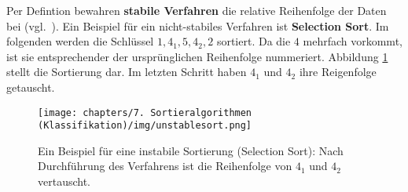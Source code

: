 Per Defintion bewahren \textbf{stabile Verfahren} die relative Reihenfolge der Daten bei (vgl.~\cite[170]{GD18e}). Ein Beispiel für ein nicht-stabiles Verfahren ist \textbf{Selection Sort}.
Im folgenden werden die Schlüssel $1, 4_1, 5, 4_2, 2$ sortiert.
Da die $4$ mehrfach vorkommt, ist sie entsprechender der ursprünglichen Reihenfolge nummeriert.
Abbildung \ref{fig:unstablesort} stellt die Sortierung dar.
Im letzten Schritt haben $4_1$ und $4_2$ ihre Reigenfolge getauscht.



\begin{figure}[h]
    \centering
    \texttt{[image: chapters/7. Sortieralgorithmen (Klassifikation)/img/unstablesort.png]}
    \caption{Ein Beispiel für eine instabile Sortierung (Selection Sort): Nach Durchführung des Verfahrens ist die Reihenfolge von $4_1$ und $4_2$ vertauscht.}
    \label{fig:unstablesort}
\end{figure}

